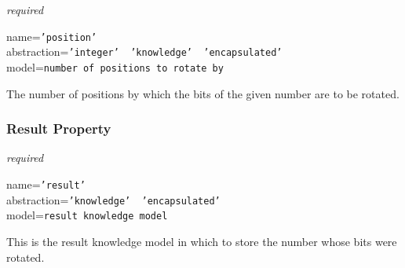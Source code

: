 \emph{required}

name=\texttt{'position'}\\
abstraction=\texttt{'integer' \vline\ 'knowledge' \vline\ 'encapsulated'}\\
model=\texttt{number of positions to rotate by}

The number of positions by which the bits of the given number are to be rotated.

\subsubsection{Result Property}

\emph{required}

name=\texttt{'result'}\\
abstraction=\texttt{'knowledge' \vline\ 'encapsulated'}\\
model=\texttt{result knowledge model}

This is the result knowledge model in which to store the number whose bits were
rotated.
